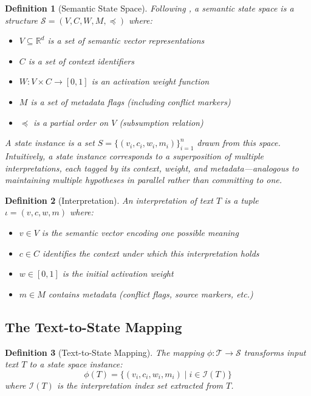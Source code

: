 \documentclass[11pt,a4paper]{article}
\newtheorem{definition}{Definition}
\begin{document}
\begin{definition}[Semantic State Space]
Following \cite{saito2025nrr}, a \textit{semantic state space} is a structure 
$\mathcal{S} = (V, C, W, M, \preceq)$ where:
\begin{itemize}
    \item $V \subseteq \mathbb{R}^d$ is a set of semantic vector representations
    \item $C$ is a set of context identifiers
    \item $W: V \times C \to [0,1]$ is an activation weight function
    \item $M$ is a set of metadata flags (including conflict markers)
    \item $\preceq$ is a partial order on $V$ (subsumption relation)
\end{itemize}
A state instance is a set $S = \{(v_i, c_i, w_i, m_i)\}_{i=1}^{n}$ drawn from this space.
Intuitively, a state instance corresponds to a \textit{superposition} of multiple 
interpretations, each tagged by its context, weight, and metadata---analogous to 
maintaining multiple hypotheses in parallel rather than committing to one.
\end{definition}

\begin{definition}[Interpretation]
An \textit{interpretation} of text $T$ is a tuple $\iota = (v, c, w, m)$ where:
\begin{itemize}
    \item $v \in V$ is the semantic vector encoding one possible meaning
    \item $c \in C$ identifies the context under which this interpretation holds
    \item $w \in [0,1]$ is the initial activation weight
    \item $m \in M$ contains metadata (conflict flags, source markers, etc.)
\end{itemize}
\end{definition}

\subsection{The Text-to-State Mapping}

\begin{definition}[Text-to-State Mapping]
The mapping $\phi: \mathcal{T} \to \mathcal{S}$ transforms input text $T$ 
to a state space instance:
\begin{equation}
\phi(T) = \{(v_i, c_i, w_i, m_i) \mid i \in \mathcal{I}(T)\}
\end{equation}
where $\mathcal{I}(T)$ is the \textit{interpretation index set} extracted from $T$.
\end{definition}
\end{document}
